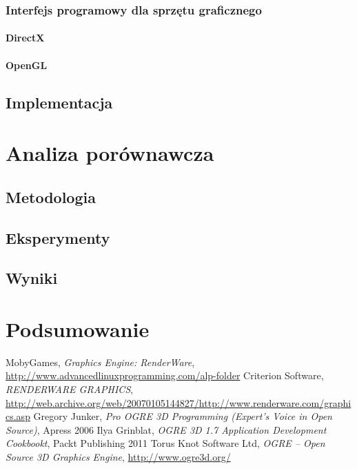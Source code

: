 \documentclass[11pt]{mwrep}
\begin{document}
     \subsection{Interfejs programowy dla sprzętu graficznego}

      \subsubsection{DirectX}

      \subsubsection{OpenGL}

  \section{Implementacja}

\chapter{Analiza porównawcza}
  \section{Metodologia}
  \section{Eksperymenty}
  \section{Wyniki}

\chapter{Podsumowanie}


\begin{thebibliography}{99}

 MobyGames, \textit{Graphics Engine: RenderWare}, \url{http://www.advancedlinuxprogramming.com/alp-folder}
 Criterion Software, \textit{RENDERWARE GRAPHICS}, \url{http://web.archive.org/web/20070105144827/http://www.renderware.com/graphics.asp}
 Gregory Junker, \textit{Pro OGRE 3D Programming (Expert's Voice in Open Source)}, Apress 2006
 Ilya Grinblat, \textit{OGRE 3D 1.7 Application Development Cookbookt}, Packt Publishing 2011
 Torus Knot Software Ltd, \textit{OGRE -- Open Source 3D Graphics Engine}, \url{http://www.ogre3d.org/}

\end{thebibliography}

\end{document}
